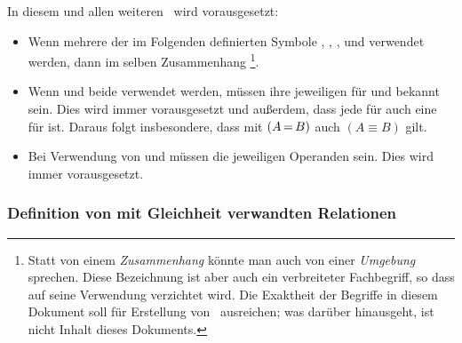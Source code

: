 In diesem und allen weiteren \sectionnames\ wird vorausgesetzt:
\begin{itemize}
	\item Wenn mehrere der im Folgenden definierten Symbole \symqt{$\metadefeq$}, , \symqt{$=$}, \symqt{$\ne$} und \symqt{$\equiv$} verwendet werden, dann im selben Zusammenhang%
	\footnote{%
		Statt von einem \emph{Zusammenhang} könnte man auch von einer \emph{Umgebung} sprechen.
		Diese Bezeichnung ist aber auch ein verbreiteter Fachbegriff, so dass auf seine Verwendung verzichtet wird.
		Die Exaktheit der Begriffe in diesem Dokument soll für Erstellung von \ASBA\ ausreichen; was darüber hinausgeht, ist nicht Inhalt dieses Dokuments.%
	}.
	\item Wenn \symqt{$=$} und \symqt{$\equiv$} beide verwendet werden, müssen ihre jeweiligen \emph{} für \symqt{$=$} und \symqt{$\equiv$} bekannt sein.
	Dies wird immer vorausgesetzt und außerdem, dass jede  für \symqt{$\equiv$} auch eine für \symqt{$=$} ist.
	Daraus folgt insbesondere, dass mit $(A \operatorname{=} B)$ auch $(A \equiv B) $ gilt.
	\item Bei Verwendung von \symqt{$=$} und \symqt{$\equiv$} müssen die jeweiligen Operanden  sein. Dies wird immer vorausgesetzt.
\end{itemize}

\subsubsection{Definition von mit Gleichheit verwandten Relationen}%
\label{subsub:DefinitionGleichheit}

